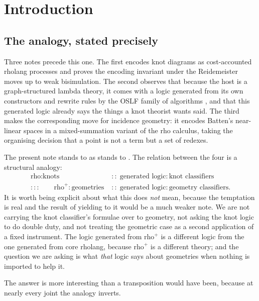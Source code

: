 \documentclass[11pt]{article}
\theoremstyle{plain}
\theoremstyle{definition}
\newcommand{\rhoplus}{\mathrm{rho}^{+}}
\begin{document}
\tableofcontents

\section{Introduction}

\subsection{The analogy, stated precisely}

Three notes precede this one. The first \cite{Knots} encodes knot diagrams as cost-accounted
rholang processes and proves the encoding invariant under the Reidemeister moves up to weak
bisimulation. The second \cite{Classifier} observes that because the host is a graph-structured
lambda theory, it comes with a logic generated from its own constructors and rewrite rules by the
OSLF family of algorithms \cite{OSLF}, and that this generated logic already says the things a
knot theorist wants said. The third \cite{Geometry} makes the corresponding move for incidence
geometry: it encodes Batten's near-linear spaces \cite{Batten} in a mixed-summation variant of the
rho calculus, taking the organising decision that a point is not a term but a set of redexes.

The present note stands to \cite{Geometry} as \cite{Classifier} stands to \cite{Knots}. The
relation between the four is a structural analogy:
\begin{align*}
\text{rho} : \text{knots} \;&::\; \text{generated logic} : \text{knot classifiers}\\
:::\qquad \rhoplus : \text{geometries} \;&::\; \text{generated logic} : \text{geometry classifiers}.
\end{align*}
It is worth being explicit about what this does \emph{not} mean, because the temptation is real and
the result of yielding to it would be a much weaker note. We are not carrying the knot classifier's
formulae over to geometry, not asking the knot logic to do double duty, and not treating the
geometric case as a second application of a fixed instrument. The logic generated from $\rhoplus$
is a different logic from the one generated from core rholang, because $\rhoplus$ is a different
theory; and the question we are asking is what \emph{that} logic says about geometries when
nothing is imported to help it.

The answer is more interesting than a transposition would have been, because at nearly every joint
the analogy inverts.
\end{document}
